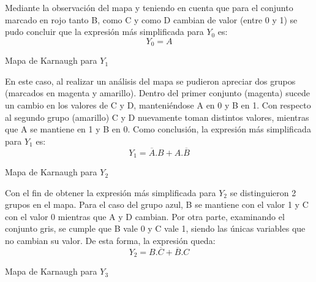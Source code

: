 \noindent
Mediante la observaci\'on del mapa y teniendo en cuenta que para el conjunto marcado en rojo tanto B, como C y como D cambian de valor (entre 0 y 1) se pudo concluir que la expresi\'on m\'as simplificada para $Y_0$ es:
\begin{equation}
    Y_0 = A
    \label{ecy0}
\end{equation}

\begin{center}
Mapa de Karnaugh para $Y_1$

\begin{Karnaugh4}
    \centering
\end{Karnaugh4}
\end{center}

\noindent
En este caso, al realizar un an\'alisis del mapa se pudieron apreciar dos grupos (marcados en magenta y amarillo). Dentro del primer conjunto (magenta) sucede un cambio en los valores de C y D, manteni\'endose A en 0 y B en 1. Con respecto al segundo grupo (amarillo) C y D nuevamente toman distintos valores, mientras que A se mantiene en 1 y B en 0. Como conclusi\'on, la expresi\'on m\'as simplificada para $Y_1$ es: 
\begin{equation}
    Y_1 = \overline{A}.B
 + A.\overline{B}
 \label{ecy1}
\end{equation}

\begin{center}
Mapa de Karnaugh para $Y_2$

\begin{Karnaugh4}
    \centering
\end{Karnaugh4}
\end{center}

\noindent
Con el fin de obtener la expresi\'on m\'as simplificada para $Y_2$ se distinguieron 2 grupos en el mapa. Para el caso del grupo azul, B se mantiene con el valor 1 y C con el valor 0 mientras que A y D cambian. Por otra parte, examinando el conjunto gris, se cumple que B vale 0 y C vale 1, siendo las \'unicas variables que no cambian su valor. De esta forma, la expresi\'on queda:
\begin{equation}
    Y_2 = B.\overline{C}
 + \overline{B}.C
 \label{ecy2}
\end{equation}
\begin{center}
Mapa de Karnaugh para $Y_3$

\begin{Karnaugh4}
    \centering
\end{Karnaugh4}
\end{center}

